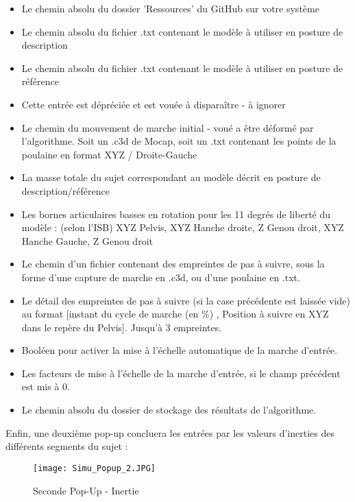 \documentclass{article}
\begin{document}
\begin{itemize}
    \item Le chemin absolu du dossier 'Ressources' du GitHub sur votre système
    \item Le chemin absolu du fichier .txt contenant le modèle à utiliser en posture de description
    \item Le chemin absolu du fichier .txt contenant le modèle à utiliser en posture de référence
    \item Cette entrée est dépréciée et est vouée à disparaître - à ignorer
    \item Le chemin du mouvement de marche initial - voué a être déformé par l'algorithme. Soit un .c3d de Mocap, soit un .txt contenant les points de la poulaine en format XYZ / Droite-Gauche
    \item La masse totale du sujet correspondant au modèle décrit en posture de description/référence
    \item Les bornes articulaires basses en rotation pour les 11 degrés de liberté du modèle : (selon l'ISB) XYZ Pelvis, XYZ Hanche droite, Z Genou droit, XYZ Hanche Gauche, Z Genou droit
    \item Le chemin d'un fichier contenant des empreintes de pas à suivre, sous la forme d'une capture de marche en .c3d, ou d'une poulaine en .txt.
    \item Le détail des empreintes de pas à suivre (si la case précédente est laissée vide) au format [instant du cycle de marche (en \%) , Position à suivre en XYZ dans le repère du Pelvis]. Jusqu'à 3 empreintes.
    \item Booléen pour activer la mise à l'échelle automatique de la marche d'entrée. 
    \item Les facteurs de mise à l'échelle de la marche d'entrée, si le champ précédent est mis à 0.
    \item Le chemin absolu du dossier de stockage des résultats de l'algorithme.
\end{itemize}

\noindent Enfin, une deuxième pop-up concluera les entrées par les valeurs d'inerties des différents segments du sujet :

\begin{figure}[H]
    \centering
    \texttt{[image: Simu\_Popup\_2.JPG]}
    \caption{Seconde Pop-Up - Inertie}
    \label{fig:Popup2}
\end{figure}
%
%
\end{document}
